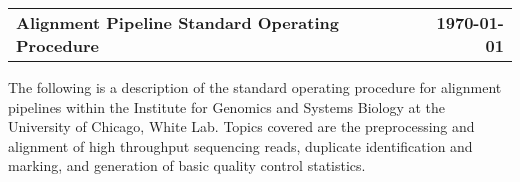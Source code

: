 \documentclass[letterpaper,11pt]{article}
\begin{document}
  \begin{tabular}{ l r }
    \textbf{\Large Alignment Pipeline Standard Operating Procedure} & \textbf{\today} \\
  \end{tabular}

  \vspace{\vspacepts}
  The following is a description of the standard operating procedure for alignment
  pipelines within the Institute for Genomics and Systems Biology at the University
  of Chicago, White Lab. Topics covered are the preprocessing and alignment of high
  throughput sequencing reads, duplicate identification and marking, and generation
  of basic quality control statistics.
  
  
  
  
  
\end{document}

